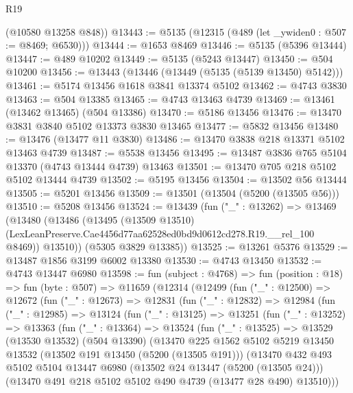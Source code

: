 \begin{lexlean}{R19}
\begin{coremodule}
{{{{{{{{{{{      (@10580 @13258 @848))
@13443 := @5135 (@12315 (@489 (let _ywiden0 : @507 := @8469; @6530)))
@13444 := @1653 @8469
@13446 := @5135 (@5396 @13444)
@13447 := @489 @10202
@13449 := @5135 (@5243 @13447)
@13450 := @504 @10200
@13456 := @13443 (@13446 (@13449 (@5135 (@5139 @13450) @5142)))
@13461 := @5174 @13456 @1618 @3841 @13374 @5102
@13462 := @4743 @3830
@13463 := @504 @13385
@13465 := @4743 @13463 @4739
@13469 := @13461 (@13462 @13465) (@504 @13386)
@13470 := @5186 @13456
@13476 := @13470 @3831 @3840 @5102 @13373 @3830 @13465
@13477 := @5832 @13456
@13480 := @13476 (@13477 @11 @3830)
@13486 := @13470 @3838 @218 @13371 @5102 @13463 @4739
@13487 := @5538 @13456
@13495 := @13487 @3836 @765 @5104 @13370 (@4743 @13444 @4739) @13463
@13501 := @13470 @705 @218 @5102 @5102 @13444 @4739
@13502 := @5195 @13456
@13504 := @13502 @56 @13444
@13505 := @5201 @13456
@13509 := @13501 (@13504 (@5200 (@13505 @56)))
@13510 := @5208 @13456
@13524 := @13439
    (fun ("_" : @13262) =>
    @13469
      (@13480
        (@13486
          (@13495
            (@13509 @13510)
            (LexLeanPreserve.Cae4456d77aa62528ed0bd9d0612cd278.R19.__rel_100 @8469))
          @13510))
      (@5305 @3829 @13385))
@13525 := @13261 @5376
@13529 := @13487 @1856 @3199 @6002 @13380
@13530 := @4743 @13450
@13532 := @4743 @13447 @6980
@13598 := fun (subject : @4768) =>
  fun (position : @18) =>
  fun (byte : @507) =>
  @11659
    (@12314
      (@12499
        (fun ("_" : @12500) =>
        @12672
          (fun ("_" : @12673) =>
          @12831
            (fun ("_" : @12832) =>
            @12984
              (fun ("_" : @12985) =>
              @13124
                (fun ("_" : @13125) =>
                @13251
                  (fun ("_" : @13252) =>
                  @13363
                    (fun ("_" : @13364) =>
                    @13524
                      (fun ("_" : @13525) =>
                      @13529
                        (@13530 @13532)
                        (@504 @13390)
                        (@13470
                          @225
                          @1562
                          @5102
                          @5219
                          @13450
                          @13532
                          (@13502 @191 @13450 (@5200 (@13505 @191)))
                          (@13470
                            @432
                            @493
                            @5102
                            @5104
                            @13447
                            @6980
                            (@13502 @24 @13447 (@5200 (@13505 @24)))
                            (@13470 @491 @218 @5102 @5102 @490 @4739 (@13477 @28 @490) @13510)))
}}}}}}}}}}}
\end{coremodule}
\end{lexlean}
